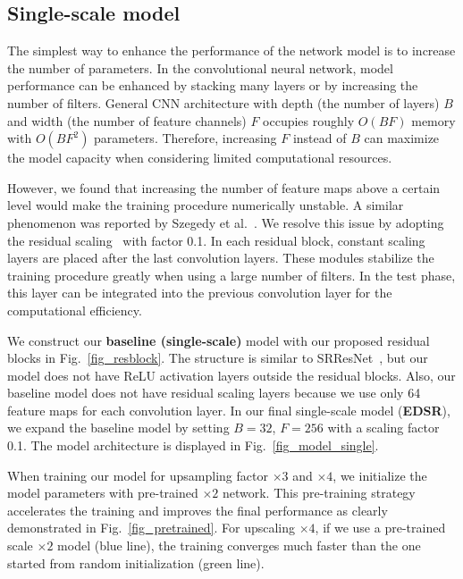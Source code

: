\documentclass[10pt,twocolumn,letterpaper]{article}
\begin{document}
	\subsection{Single-scale model} 
	\label{sec_3_single}
	
	The simplest way to enhance the performance of the network model is to increase the number of parameters.
	In the convolutional neural network, model performance can be enhanced by stacking many layers or by increasing the number of filters. 
	General CNN architecture with depth (the number of layers) $B$ and width (the number of feature channels) $F$ occupies roughly $O(BF)$ memory with $O(BF^2)$ parameters. 
	Therefore, increasing $F$ instead of $B$ can maximize the model capacity when considering limited computational resources.
	
	However, we found that increasing the number of feature maps above a certain level would make the training procedure numerically unstable. A similar phenomenon was reported by Szegedy et al.~\cite{szegedy2016inception}.
	We resolve this issue by adopting the residual scaling~\cite{szegedy2016inception} with factor 0.1.
	In each residual block, constant scaling layers are placed after the last convolution layers.
	These modules stabilize the training procedure greatly when using a large number of filters.
	In the test phase, this layer can be integrated into the previous convolution layer for the computational efficiency.
	
	We construct our \textbf{baseline (single-scale)} model with our proposed residual blocks in Fig.~\ref{fig_resblock}.
	The structure is similar to SRResNet~\cite{ledig2016photo}, but our model does not have ReLU activation layers outside the residual blocks.
	Also, our baseline model does not have residual scaling layers because we use only 64 feature maps for each convolution layer.
	In our final single-scale model (\textbf{EDSR}), we expand the baseline model by setting $B=32$, $F=256$ with a scaling factor 0.1.
	The model architecture is displayed in Fig.~\ref{fig_model_single}.
	
	When training our model for upsampling factor $\times 3$ and $\times 4$, we initialize the model parameters with pre-trained $\times2$ network.
	This pre-training strategy accelerates the training and improves the final performance as clearly demonstrated in Fig.~\ref{fig_pretrained}.
	For upscaling $\times 4$, if we use a pre-trained scale $\times 2$ model (blue line), the training converges much faster than the one started from random initialization (green line).
		
\end{document}
